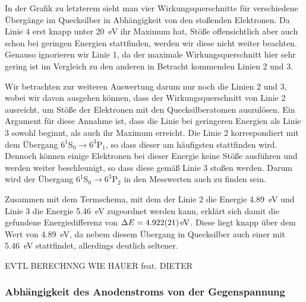 \documentclass[11pt, a4paper]{article}
\begin{document}
In der Grafik zu letzterem sieht man vier Wirkungsquerschnitte für verschiedene Übergänge im Quecksilber in Abhängigkeit von den stoßenden Elektronen.
Da Linie 4 erst knapp unter \SI{20}{\electronvolt} ihr Maximum hat, Stöße offensichtlich aber auch schon bei geringen Energien stattfinden, werden wir diese nicht weiter beachten.
Genauso ignorieren wir Linie 1, da der maximale Wirkungsquerschnitt hier sehr gering ist im Vergleich zu den anderen in Betracht kommenden Linien 2 und 3.

Wir betrachten zur weiteren Auswertung darum nur noch die Linien 2 und 3, wobei wir davon ausgehen können, dass der Wirkungsquerschnitt von Linie 2 ausreicht, um Stöße der Elektronen mit den Quecksilberatomen auszulösen.
Ein Argument für diese Annahme ist, dass die Linie bei geringeren Energien als Linie 3 sowohl beginnt, als auch ihr Maximum erreicht.
Die Linie 2 korrespondiert mit dem Übergang $6^1$S$_0\rightarrow6^3$P$_1$, so dass dieser am häufigsten stattfinden wird.
Dennoch können einige Elektronen bei dieser Energie keine Stöße ausführen und werden weiter beschleunigt, so dass diese gemäß Linie 3 stoßen werden.
Darum wird der Übergang $6^1$S$_0\rightarrow6^3$P$_2$ in den Messwerten auch zu finden sein.

Zusammen mit dem Termschema, mit dem der Linie 2 die Energie \SI{4.89}{\electronvolt} und Linie 3 die Energie \SI{5.46}{\electronvolt} zugeordnet werden kann, erklärt sich damit die gefundene Energiedifferenz von $\Delta E = \SI{4.922+-0.021}{\electronvolt}$.
Diese liegt knapp über dem Wert von \SI{4.89}{\electronvolt}, da nebem diesem Übergang in Quecksilber auch einer mit \SI{5.46}{\electronvolt} stattfindet, allerdings deutlich seltener.

EVTL BERECHNNG WIE HAUER feat. DIETER

\subsubsection{Abhängigkeit des Anodenstroms von der Gegenspannung}
\end{document}
